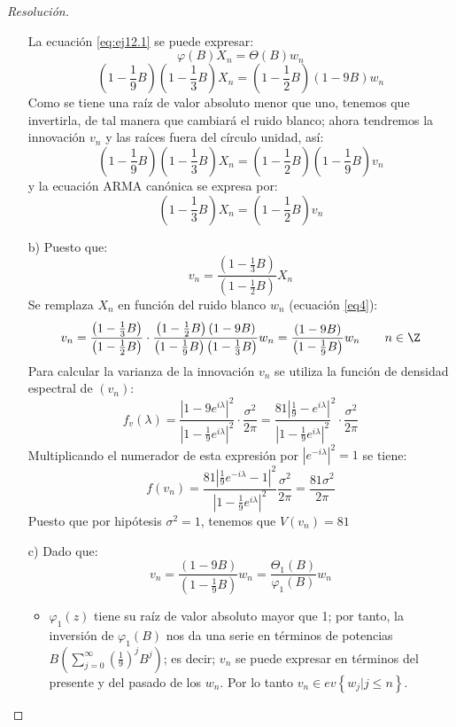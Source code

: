 \begin{ejemplo}
\begin{proof}[Resoluci\'{o}n]
\begin{enumerate}
La ecuaci\'{o}n \eqref{eq:ej12.1} se puede expresar:
\[
\varphi (B) X_{n} =\Theta (B)w_{n} 
\]
\begin{equation}
\label{eq4}
\left( {1-\frac{1}{9}B} \right) \left( {1-\frac{1}{3}B} \right) X_{n} 
=\left( {1-\frac{1}{2}B} \right)\left( {1-9B} \right) w_{n} 
\end{equation}
Como se tiene una ra\'{i}z de valor absoluto menor que uno, tenemos que invertirla, de tal manera que cambiar\'{a} el ruido blanco; ahora tendremos la innovaci\'{o}n $v_{n}$ y las ra\'{i}ces fuera del c\'{i}rculo unidad, as\'{i}:
\[
\left( {1-\frac{1}{9}B} \right)\left( {1-\frac{1}{3}B} \right) X_{n} 
=\left( {1-\frac{1}{2}B} \right) \left( {1-\frac{1}{9}B} \right)v_{n} 
\]
y la ecuaci\'{o}n ARMA can\'{o}nica se expresa por:
\[
\left( {1-\frac{1}{3}B} \right)X_{n} =\left( {1-\frac{1}{2}B} 
\right)v_{n} 
\]

\item[b)] Puesto que:
\[
v_{n} =\frac{\left( {1-\frac{1}{3}B} \right)}{\left( {1-\frac{1}{2}B} 
\right)}X_{n} 
\]
Se remplaza $X_{{n}}$ en funci\'{o}n del ruido blanco $w_{n}$ (ecuaci\'{o}n \eqref{eq4}):
\[
v_{n} =\frac{\left( {1-\frac{1}{3}B} \right)}{\left( {1-\frac{1}{2}B} 
\right)}\cdot \frac{\left( {1-\frac{1}{2}B} \right)\left( {1-9B} 
\right)}{\left( {1-\frac{1}{9}B} \right)\left( {1-\frac{1}{3}B} 
\right)}w_{n} 
=\frac{\left( {1-9B} \right)}{\left( {1-\frac{1}{9}B} \right)}w_{n} \qquad n\in \Z
\]
Para calcular la varianza de la innovaci\'{o}n $v_{n}$ se utiliza la funci\'{o}n de densidad espectral de $(v_{n})$:
\[
f_{v} (\lambda )=\frac{\left| {1-9 e^{i\lambda } } \right|^{2}}{\left| 
{1-\frac{1}{9} e^{i\lambda }} \right|^{2}}\cdot \frac{\sigma^{2}}{2\pi 
}=\frac{81\left| {\frac{1}{9}-e^{i\lambda }} \right|}{\left| 
{1-\frac{1}{9}e^{i\lambda }} \right|^{2}}^{2}\cdot \frac{\sigma^{2}}{2\pi }
\]
Multiplicando el numerador de esta expresi\'{o}n por $\left| {e^{-i\lambda }} \right|^{2}=1$ se tiene:
\[
f (v_{n} )=\frac{81\left| {\frac{1}{9}e^{-i\lambda }-1} \right|^{2}}{\left| 
{1-\frac{1}{9}e^{i\lambda }} \right|^{2}}\frac{\sigma^{2}}{2\pi }=
\frac{81\sigma^{2}}{2\pi }
\]
Puesto que por hip\'{o}tesis $\sigma^{2}=1$, tenemos que $V(v_{n})=81$ 

\item[c)] Dado que:
\[
 v_{n}=\frac{\left( {1-9B} \right) }{\left( {1-\frac{1}{9}B} 
\right)}w_{n} =\frac{\Theta_{1}  (B)}{\varphi_{1}  (B)}w_{n} 
\]
\begin{itemize}
\item $\varphi_{1}  (z)$ tiene su ra\'{i}z de valor absoluto mayor que 1; por tanto, la inversi\'{o}n de $\varphi_{1} (B)$ nos da una serie en t\'{e}rminos de potencias $B\left( {\sum_{j=0}^\infty {\left( {\frac{1}{9}} \right)^{j}B^{j}} } \right)$; es decir; $v_{n} $ se puede expresar en t\'{e}rminos del presente y del pasado de los $w_{n}$. Por lo tanto $v_{n }\in   ev\left\{ {w_{j} \left| {j\le n} \right.} \right\}$.


\end{itemize}
\end{enumerate}
\end{proof}
\end{ejemplo}
